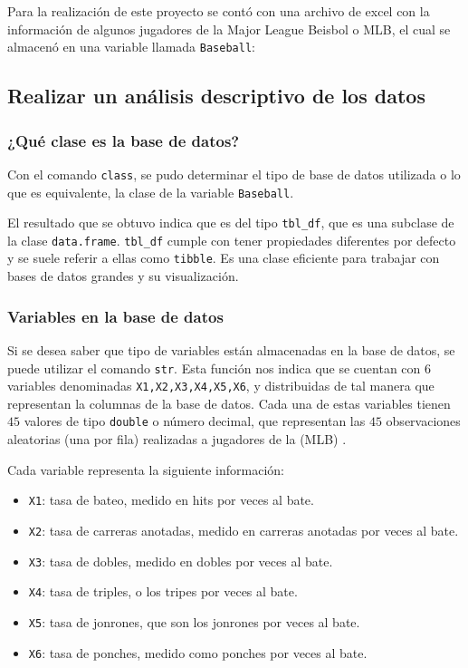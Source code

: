 \documentclass{staprojteamusb}
\providecommand{\tightlist}{%
	\setlength{\itemsep}{0pt}\setlength{\parskip}{0pt}}
\begin{document}
 Para la realización de este proyecto se contó con una archivo de excel con la información de algunos jugadores de la Major League Beisbol o MLB, el cual se almacenó en una variable llamada \texttt{Baseball}:

 \hypertarget{realizar-un-anuxe1lisis-descriptivo-de-los-datos}{%
 \subsection{Realizar un análisis descriptivo de los datos}\label{realizar-un-anuxe1lisis-descriptivo-de-los-datos}}

 \hypertarget{quuxe9-clase-es-la-base-de-datos}{%
 \subsubsection{¿Qué clase es la base de datos?}\label{quuxe9-clase-es-la-base-de-datos}}

 Con el comando \texttt{class}, se pudo determinar el tipo de base de datos utilizada o lo que es equivalente, la clase de la variable \texttt{Baseball}.

 El resultado que se obtuvo indica que es del tipo \texttt{tbl\_df}, que es una subclase de la clase \texttt{data.frame}. \texttt{tbl\_df} cumple con tener propiedades diferentes por defecto y se suele referir a ellas como \texttt{tibble}. Es una clase eficiente para trabajar con bases de datos grandes y su visualización.

 \hypertarget{variables-en-la-base-de-datos}{%
 \subsubsection{Variables en la base de datos}\label{variables-en-la-base-de-datos}}

 Si se desea saber que tipo de variables están almacenadas en la base de datos, se puede utilizar el comando \texttt{str}. Esta función nos indica que se cuentan con \(6\) variables denominadas \texttt{X1,X2,X3,X4,X5,X6}, y distribuidas de tal manera que representan la columnas de la base de datos. Cada una de estas variables tienen \(45\) valores de tipo \texttt{double} o número decimal, que representan las \(45\) observaciones aleatorias (una por fila) realizadas a jugadores de la (MLB) .

 Cada variable representa la siguiente información:

 \begin{itemize}
 \tightlist
 \item
   \texttt{X1}: tasa de bateo, medido en hits por veces al bate.
 \item
   \texttt{X2}: tasa de carreras anotadas, medido en carreras anotadas por veces al bate.
 \item
   \texttt{X3}: tasa de dobles, medido en dobles por veces al bate.
 \item
   \texttt{X4}: tasa de triples, o los tripes por veces al bate.
 \item
   \texttt{X5}: tasa de jonrones, que son los jonrones por veces al bate.
 \item
   \texttt{X6}: tasa de ponches, medido como ponches por veces al bate.
 \end{itemize}
\end{document}
